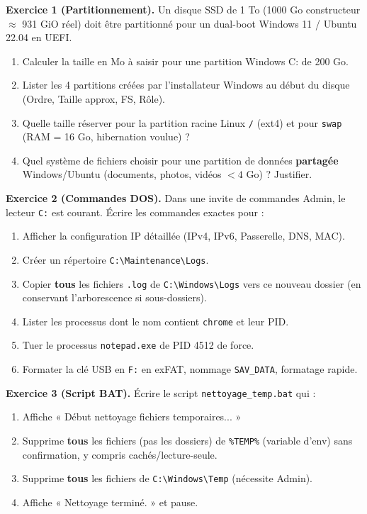 \documentclass[11pt]{article}
\begin{document}
\begin{exercice}
\textbf{Exercice 1 (Partitionnement).} Un disque SSD de 1 To (1000 Go constructeur $\approx$ 931 GiO réel) doit être partitionné pour un dual-boot Windows 11 / Ubuntu 22.04 en UEFI.
\begin{enumerate}
  \item Calculer la taille en Mo à saisir pour une partition Windows C: de 200 Go.
  \item Lister les 4 partitions créées par l'installateur Windows au début du disque (Ordre, Taille approx, FS, Rôle).
  \item Quelle taille réserver pour la partition racine Linux \texttt{/} (ext4) et pour \texttt{swap} (RAM = 16 Go, hibernation voulue) ?
  \item Quel système de fichiers choisir pour une partition de données \textbf{partagée} Windows/Ubuntu (documents, photos, vidéos $< 4$ Go) ? Justifier.
\end{enumerate}

\textbf{Exercice 2 (Commandes DOS).} Dans une invite de commandes Admin, le lecteur \texttt{C:} est courant. Écrire les commandes exactes pour :
\begin{enumerate}
  \item Afficher la configuration IP détaillée (IPv4, IPv6, Passerelle, DNS, MAC).
  \item Créer un répertoire \texttt{C:\textbackslash Maintenance\textbackslash Logs}.
  \item Copier \textbf{tous} les fichiers \texttt{.log} de \texttt{C:\textbackslash Windows\textbackslash Logs} vers ce nouveau dossier (en conservant l'arborescence si sous-dossiers).
  \item Lister les processus dont le nom contient \texttt{chrome} et leur PID.
  \item Tuer le processus \texttt{notepad.exe} de PID 4512 de force.
  \item Formater la clé USB en \texttt{F:} en exFAT, nommage \texttt{SAV\_DATA}, formatage rapide.
\end{enumerate}

\textbf{Exercice 3 (Script BAT).} Écrire le script \texttt{nettoyage\_temp.bat} qui :
\begin{enumerate}
  \item Affiche « Début nettoyage fichiers temporaires... »
  \item Supprime \textbf{tous} les fichiers (pas les dossiers) de \texttt{\%TEMP\%} (variable d'env) sans confirmation, y compris cachés/lecture-seule.
  \item Supprime \textbf{tous} les fichiers de \texttt{C:\textbackslash Windows\textbackslash Temp} (nécessite Admin).
  \item Affiche « Nettoyage terminé. » et pause.
\end{enumerate}
\end{exercice}
\end{document}

